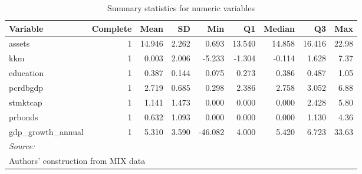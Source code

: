 \documentclass[a4paper,nobind]{templates/ociamthesis}
\newenvironment{Shaded}{\begin{snugshade}}{\end{snugshade}}
\newcommand{\AttributeTok}[1]{\textcolor[rgb]{0.77,0.63,0.00}{#1}}
\newcommand{\ConstantTok}[1]{\textcolor[rgb]{0.00,0.00,0.00}{#1}}
\newcommand{\DecValTok}[1]{\textcolor[rgb]{0.00,0.00,0.81}{#1}}
\newcommand{\FunctionTok}[1]{\textcolor[rgb]{0.00,0.00,0.00}{#1}}
\newcommand{\NormalTok}[1]{#1}
\newcommand{\SpecialCharTok}[1]{\textcolor[rgb]{0.00,0.00,0.00}{#1}}
\newcommand{\StringTok}[1]{\textcolor[rgb]{0.31,0.60,0.02}{#1}}
\renewenvironment{Shaded}
{
  \vspace{10pt}%
  \begin{snugshade}%
}{%
  \end{snugshade}%
  \vspace{8pt}%
}
\begin{document}
\begin{table}

\caption{\label{tab:unnamed-chunk-17}Summary statistics for numeric variables}
\centering
\begin{tabular}[t]{lrrrrrrrr}
\toprule
Variable & Complete & Mean & SD & Min & Q1 & Median & Q3 & Max\\
\midrule
assets & 1 & 14.946 & 2.262 & 0.693 & 13.540 & 14.858 & 16.416 & 22.98\\
kkm & 1 & 0.003 & 2.006 & -5.233 & -1.304 & -0.114 & 1.628 & 7.37\\
education & 1 & 0.387 & 0.144 & 0.075 & 0.273 & 0.386 & 0.487 & 1.05\\
pcrdbgdp & 1 & 2.719 & 0.685 & 0.298 & 2.386 & 2.758 & 3.052 & 6.88\\
stmktcap & 1 & 1.141 & 1.473 & 0.000 & 0.000 & 0.000 & 2.428 & 5.80\\
\addlinespace
prbonds & 1 & 0.632 & 1.093 & 0.000 & 0.000 & 0.000 & 1.130 & 4.36\\
gdp\_growth\_annual & 1 & 5.310 & 3.590 & -46.082 & 4.000 & 5.420 & 6.723 & 33.63\\
\bottomrule
\multicolumn{9}{l}{\rule{0pt}{1em}\textit{Source: }}\\
\multicolumn{9}{l}{\rule{0pt}{1em}Authors' construction from MIX data}\\
\end{tabular}
\end{table}

\begin{Shaded}
\end{Shaded}
\end{document}
